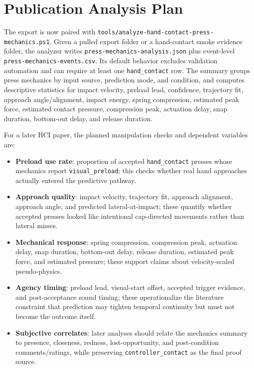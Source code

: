 \documentclass[11pt]{article}
\begin{document}
\section{Publication Analysis Plan}
The export is now paired with \texttt{tools/analyze-hand-contact-press-mechanics.ps1}. Given a pulled export folder or a hand-contact smoke evidence folder, the analyzer writes \texttt{press-mechanics-analysis.json} plus event-level \texttt{press-mechanics-events.csv}. Its default behavior excludes validation automation and can require at least one \texttt{hand\_contact} row. The summary groups press mechanics by input source, prediction mode, and condition, and computes descriptive statistics for impact velocity, preload lead, confidence, trajectory fit, approach angle/alignment, impact energy, spring compression, estimated peak force, estimated contact pressure, compression peak, actuation delay, snap duration, bottom-out delay, and release duration.

For a later HCI paper, the planned manipulation checks and dependent variables are:
\begin{itemize}
  \item \textbf{Preload use rate}: proportion of accepted \texttt{hand\_contact} presses whose mechanics report \texttt{visual\_preload}; this checks whether real hand approaches actually entered the predictive pathway.
  \item \textbf{Approach quality}: impact velocity, trajectory fit, approach alignment, approach angle, and predicted lateral-at-impact; these quantify whether accepted presses looked like intentional cap-directed movements rather than lateral misses.
  \item \textbf{Mechanical response}: spring compression, compression peak, actuation delay, snap duration, bottom-out delay, release duration, estimated peak force, and estimated pressure; these support claims about velocity-scaled pseudo-physics.
  \item \textbf{Agency timing}: preload lead, visual-start offset, accepted trigger evidence, and post-acceptance sound timing; these operationalize the literature constraint that prediction may tighten temporal continuity but must not become the outcome itself.
  \item \textbf{Subjective correlates}: later analyses should relate the mechanics summary to presence, closeness, redness, lost-opportunity, and post-condition comments/ratings, while preserving \texttt{controller\_contact} as the final proof source.
\end{itemize}
\end{document}
